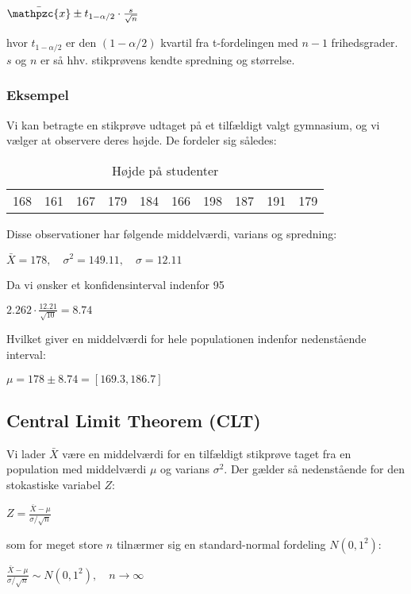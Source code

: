 \documentclass{article}
\newcommand{\mellemrum}{\vspace{2 ex}}
\newcommand{\cent}[1]{ \mellemrum \begin{center} #1\end{center} \mellemrum }
\newcommand{\script}[1]{\mathpzc{#1}}
\begin{document}
	\cent{$ \bar{\script{x}}\pm t_{1-\alpha/2} \cdot \frac{s}{\sqrt{n}} $}
	
	hvor $t_{1-\alpha / 2}$ er den $(1-\alpha /2)$ kvartil fra t-fordelingen med $n-1$ frihedsgrader. $s$ og $n$ er så hhv. stikprøvens kendte spredning og størrelse.\\
	
	\subsubsection{Eksempel}
	
	Vi kan betragte en stikprøve udtaget på et tilfældigt valgt gymnasium, og vi vælger at observere deres højde. De fordeler sig således:
	
	\begin{table}[H]
		\centering
		\begin{tabular}{llllllllll}
			168 & 161 & 167 & 179 & 184 & 166 & 198 & 187 & 191 & 179
		\end{tabular}
	\caption{Højde på studenter}
	\end{table}
	
	Disse observationer har følgende middelværdi, varians og spredning:
	
	\cent{$ \bar{X} = 178, \quad \sigma^2 = 149.11, \quad \sigma = 12.11 $}
	
	Da vi ønsker et konfidensinterval indenfor 95%
	
	\cent{$ 2.262 \cdot \frac{12.21}{\sqrt{10}} = 8.74$}
	
	Hvilket giver en middelværdi for hele populationen indenfor nedenstående interval:
	
	\cent{$\mu = 178 \pm 8.74 = [169.3,186.7]$}
	
	\subsection{Central Limit Theorem (CLT)}
	
	Vi lader $ \bar{X} $ være en middelværdi for en tilfældigt stikprøve taget fra en population med middelværdi $\mu$ og varians $\sigma^2$. Der gælder så nedenstående for den stokastiske variabel $Z$: 
	
	\cent{$ Z = \frac{\bar{X} - \mu}{\sigma / \sqrt{n}} $}
	
	som for meget store $n$ tilnærmer sig en standard-normal fordeling $N(0,1^2)$:
	
	\cent{$\frac{\bar{X} - \mu}{\sigma / \sqrt{n}} \sim N(0,1^2), \quad n\rightarrow \infty$}
	
\end{document}
